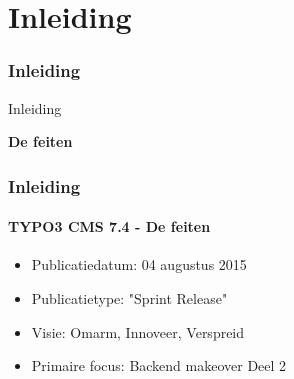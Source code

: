 %

\section{Inleiding}
\begin{frame}[fragile]
	\frametitle{Inleiding}

	\begin{center}\huge{Inleiding}\end{center}
	\begin{center}\huge{\color{typo3darkgrey}\textbf{De feiten}}\end{center}

\end{frame}

\begin{frame}[fragile]
	\frametitle{Inleiding}
	\framesubtitle{TYPO3 CMS 7.4 - De feiten}

	\begin{itemize}
		\item Publicatiedatum: 04 augustus 2015
		\item Publicatietype: "Sprint Release"
		\item Visie: Omarm, Innoveer, Verspreid
		\item Primaire focus: Backend makeover Deel 2
	\end{itemize}

\end{frame}

